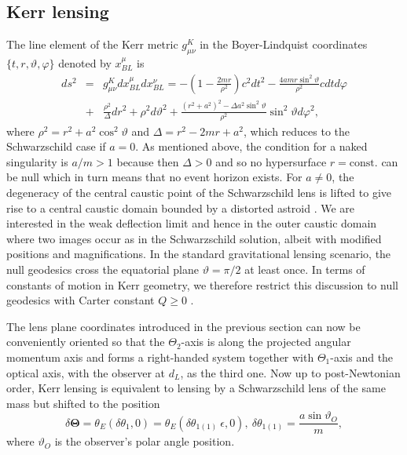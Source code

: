 \documentclass[prd,12pt,a4paper,showpacs]{revtex4}
\def\dx{\delta\theta_{1(1)}}
\def\xo{\theta_1}
\def\t{\Theta}
\def\to{\t_1}
\def\tt{\t_2}
\begin{document}
\subsection{Kerr lensing}

The line element of the Kerr metric $g^K_{\mu\nu}$ in the Boyer-Lindquist coordinates 
$\{t,r,\vartheta,\varphi\}$ denoted by $x^\mu_{BL}$ is \cite{chandra}
\begin{eqnarray}
ds^2&=&g^K_{\mu\nu}dx^\mu_{BL} dx^\nu_{BL}=-\left(1-\frac{2mr}{\rho^2} \right)c^2dt^2-\frac{4amr\sin^2\vartheta}{\rho^2}cdtd\varphi \nonumber \\
&+&\frac{\rho^2}{\Delta}dr^2+\rho^2d\vartheta^2+\frac{(r^2+a^2)^2-\Delta a^2\sin^2\vartheta}{\rho^2}\sin^2\vartheta d\varphi^2,
\label{kerr}
\end{eqnarray}
where $\rho^2=r^2+a^2\cos^2\vartheta$ and $\Delta=r^2-2mr+a^2$, 
which reduces to the Schwarzschild case if $a=0$. As mentioned above, the condition for a 
naked singularity is $a/m>1$ because then $\Delta >0$ and so no hypersurface $r=\mathrm{const.}$ 
can be null which in turn means that no event horizon exists. For $a\neq 0$, the 
degeneracy of the central caustic point of the Schwarzschild lens 
is lifted to give rise to a central caustic domain bounded by a 
distorted astroid \cite{rauch}. 
We are interested in the weak deflection limit and hence in the outer 
caustic domain where two images occur as in the Schwarzschild solution, 
albeit with modified positions and magnifications. In the standard gravitational lensing scenario, the null geodesics 
cross the equatorial plane $\vartheta=\pi/2$ at least once. In terms of constants of motion in Kerr geometry, 
we therefore restrict this discussion to null geodesics with Carter constant $Q\geq 0$ \cite[ p. 205]{oneill}.

The lens plane coordinates introduced in the previous section 
can now be conveniently oriented so that the $\tt$-axis
is along the projected angular momentum axis and forms a right-handed system 
together with $\to$-axis and the optical axis, with the observer at $d_L$, as the third one.
Now up to post-Newtonian order, Kerr lensing is equivalent to lensing by a 
Schwarzschild lens of the same mass but shifted to the position 
\cite{rauch, asada, asada2, sereno1}
\begin{equation}
\delta\boldsymbol{\t}=\theta_E(\delta\xo,0)=\theta_E(\dx \ \epsilon,0), \ \dx=\frac{a \sin \vartheta_O}{m},
\label{shift}
\end{equation}
where $\vartheta_O$ is the observer's polar angle position. 
\end{document}
